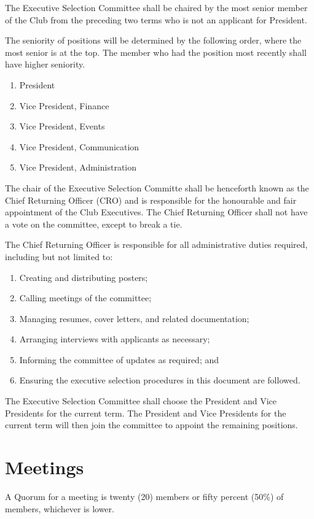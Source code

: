\documentclass[11pt]{mathsoc}
\begin{document}
The Executive Selection Committee shall be chaired by the most senior member 
of the Club from the preceding two terms who is not an applicant for President.

The seniority of positions will be determined by the following order, where 
the most senior is at the top. The member who had the position most recently 
shall have higher seniority. 

\begin{enumerate}
    \item President
    \item Vice President, Finance
    \item Vice President, Events
    \item Vice President, Communication
    \item Vice President, Administration
\end{enumerate}

The chair of the Executive Selection Committe shall be henceforth known as the
Chief Returning Officer (CRO) and is responsible for the honourable and fair
appointment of the Club Executives. The Chief Returning Officer shall not have
a vote on the committee, except to break a tie. 

The Chief Returning Officer is responsible for all administrative duties 
required, including but not limited to:
\begin{enumerate}
    \item Creating and distributing posters;
    \item Calling meetings of the committee;
    \item Managing resumes, cover letters, and related documentation;
    \item Arranging interviews with applicants as necessary;
    \item Informing the committee of updates as required; and
    \item Ensuring the executive selection procedures in this document are 
        followed.
\end{enumerate}

The Executive Selection Committee shall choose the President and Vice 
Presidents for the current term. The President and Vice Presidents for the 
current term will then join the committee to appoint the remaining positions.

\section{Meetings}
A Quorum for a meeting is twenty (20) members or fifty percent (50\%) of 
members, whichever is lower.
\end{document}
